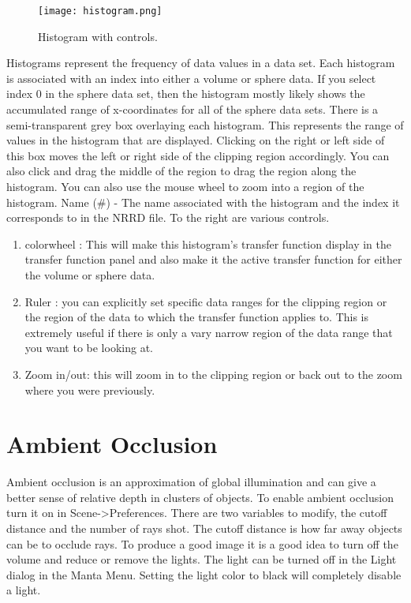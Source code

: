 \begin{figure}[htbp]
  \center
  \texttt{[image: histogram.png]}
  \caption{Histogram with controls.}
  \label{fig:manta_histogram}
\end{figure}

Histograms represent the frequency of data values in a data set. Each histogram is associated with an index into either a volume or sphere data. If you select index 0 in the sphere data set, then the histogram mostly likely shows the accumulated range of x-coordinates for all of the sphere data sets. There is a semi-transparent grey box overlaying each histogram. This represents the range of values in the histogram that are displayed. Clicking on the right or left side of this box moves the left or right side of the clipping region accordingly. You can also click and drag the middle of the region to drag the region along the histogram. You can also use the mouse wheel to zoom into a region of the histogram.
  Name (\#) - The name associated with the histogram and the index it corresponds to in the NRRD file. 
To the right are various controls.

\begin{enumerate}
\item
colorwheel : This will make this histogram's transfer function display in the transfer function panel and also make it the active transfer function for either the volume or sphere data.
\item
Ruler : you can explicitly set specific data ranges for the clipping region or the region of the data to which the transfer function applies to. This is extremely useful if there is only a vary narrow region of the data range that you want to be looking at.
\item
Zoom in/out: this will zoom in to the clipping region or back out to the zoom where you were previously. 
\end{enumerate}

\section{Ambient Occlusion}
  Ambient occlusion is an approximation of global illumination and can give a better sense of relative depth in clusters of objects.  To enable ambient occlusion turn it on in Scene->Preferences.  There are two variables to modify, the cutoff distance and the number of rays shot.  The cutoff distance is how far away objects can be to occlude rays.  To produce a good image it is a good idea to turn off the volume and reduce or remove the lights.  The light can be turned off in the Light dialog in the Manta Menu.  Setting the light color to black will completely disable a light.
  

